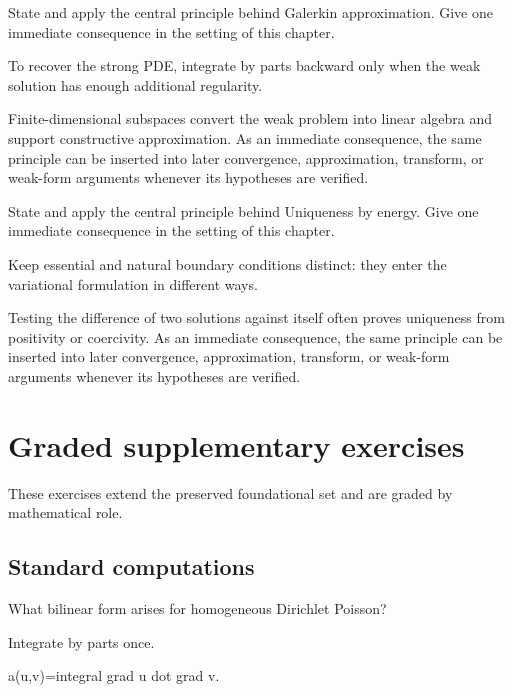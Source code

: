 \begin{exercise}\label{exr:iii23-07}
State and apply the central principle behind Galerkin approximation. Give one immediate consequence in the setting of this chapter.
\end{exercise}
\begin{hint}
To recover the strong PDE, integrate by parts backward only when the weak solution has enough additional regularity.
\end{hint}
\begin{solution}
Finite-dimensional subspaces convert the weak problem into linear algebra and support constructive approximation. As an immediate consequence, the same principle can be inserted into later convergence, approximation, transform, or weak-form arguments whenever its hypotheses are verified.
\end{solution}

\begin{exercise}\label{exr:iii23-08}
State and apply the central principle behind Uniqueness by energy. Give one immediate consequence in the setting of this chapter.
\end{exercise}
\begin{hint}
Keep essential and natural boundary conditions distinct: they enter the variational formulation in different ways.
\end{hint}
\begin{solution}
Testing the difference of two solutions against itself often proves uniqueness from positivity or coercivity. As an immediate consequence, the same principle can be inserted into later convergence, approximation, transform, or weak-form arguments whenever its hypotheses are verified.
\end{solution}


\section{Graded supplementary exercises}
These exercises extend the preserved foundational set and are graded by mathematical role.

\subsection*{Standard computations}

\begin{exercise}\label{exr:iii23-expand-01}
What bilinear form arises for homogeneous Dirichlet Poisson?
\end{exercise}
\begin{hint}
Integrate by parts once.
\end{hint}
\begin{solution}
a(u,v)=integral grad u dot grad v.
\end{solution}

